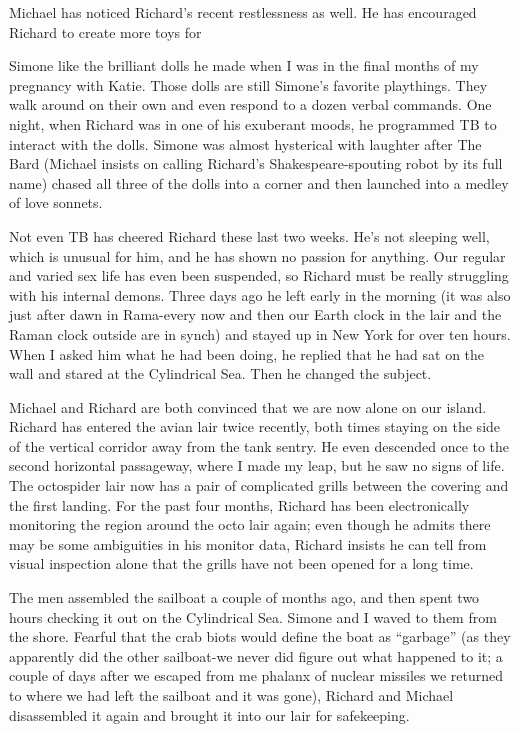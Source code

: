\documentclass[]{article}
\begin{document}
Michael has noticed Richard’s recent restlessness as well. He has encouraged Richard to create more toys for

Simone like the brilliant dolls he made when I was in the final months of my pregnancy with Katie. Those dolls are still Simone’s favorite playthings. They walk around on their own and even respond to a dozen verbal commands. One night, when Richard was in one of his exuberant moods, he programmed TB to interact with the dolls. Simone was almost hysterical with laughter after The Bard (Michael insists on calling Richard’s Shakespeare-spouting robot by its full name) chased all three of the dolls into a corner and then launched into a medley of love sonnets.

Not even TB has cheered Richard these last two weeks. He’s not sleeping well, which is unusual for him, and he has shown no passion for anything. Our regular and varied sex life has even been suspended, so Richard must be really struggling with his internal demons. Three days ago he left early in the morning (it was also just after dawn in Rama-every now and then our Earth clock in the lair and the Raman clock outside are in synch) and stayed up in New York for over ten hours. When I asked him what he had been doing, he replied that he had sat on the wall and stared at the Cylindrical Sea. Then he changed the subject.

Michael and Richard are both convinced that we are now alone on our island. Richard has entered the avian lair twice recently, both times staying on the side of the vertical corridor away from the tank sentry. He even descended once to the second horizontal passageway, where I made my leap, but he saw no signs of life. The octospider lair now has a pair of complicated grills between the covering and the first landing. For the past four months, Richard has been electronically monitoring the region around the octo lair again; even though he admits there may be some ambiguities in his monitor data, Richard insists he can tell from visual inspection alone that the grills have not been opened for a long time.

The men assembled the sailboat a couple of months ago, and then spent two hours checking it out on the Cylindrical Sea. Simone and I waved to them from the shore. Fearful that the crab biots would define the boat as “garbage” (as they apparently did the other sailboat-we never did figure out what happened to it; a couple of days after we escaped from me phalanx of nuclear missiles we returned to where we had left the sailboat and it was gone), Richard and Michael disassembled it again and brought it into our lair for safekeeping.
\end{document}
